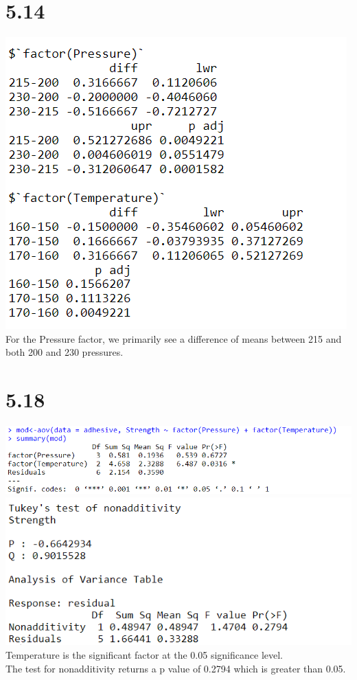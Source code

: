 \documentclass{article}
\begin{document}
\section*{5.14}
\includegraphics{5.14.PNG}
\\For the Pressure factor, we primarily see a difference of means between 215 and both 200 and 230 pressures.

\section*{5.18}
\includegraphics{5.18a.PNG}
\\\includegraphics{5.18b.PNG}
\\Temperature is the significant factor at the 0.05 significance level.
\\The test for nonadditivity returns a p value of 0.2794 which is greater than 0.05.
\end{document}
